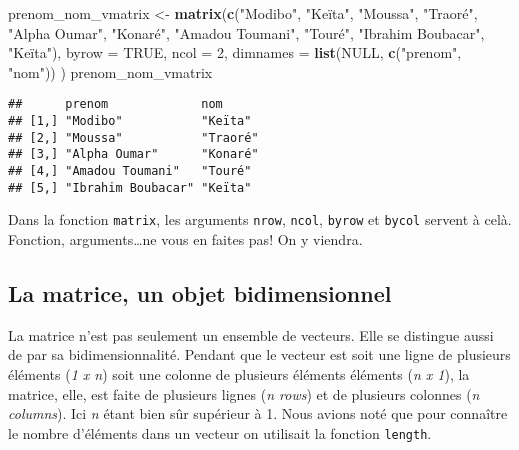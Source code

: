 \documentclass[]{book}
\newenvironment{Shaded}{\begin{snugshade}}{\end{snugshade}}
\newcommand{\KeywordTok}[1]{\textcolor[rgb]{0.13,0.29,0.53}{\textbf{#1}}}
\newcommand{\DataTypeTok}[1]{\textcolor[rgb]{0.13,0.29,0.53}{#1}}
\newcommand{\DecValTok}[1]{\textcolor[rgb]{0.00,0.00,0.81}{#1}}
\newcommand{\StringTok}[1]{\textcolor[rgb]{0.31,0.60,0.02}{#1}}
\newcommand{\OtherTok}[1]{\textcolor[rgb]{0.56,0.35,0.01}{#1}}
\newcommand{\NormalTok}[1]{#1}
\begin{document}
\begin{Shaded}
\begin{Highlighting}[]
\NormalTok{prenom_nom_vmatrix <-}\StringTok{ }\KeywordTok{matrix}\NormalTok{(}\KeywordTok{c}\NormalTok{(}\StringTok{"Modibo"}\NormalTok{, }\StringTok{"Keïta"}\NormalTok{,}
                               \StringTok{"Moussa"}\NormalTok{, }\StringTok{"Traoré"}\NormalTok{,}
                               \StringTok{"Alpha Oumar"}\NormalTok{, }\StringTok{"Konaré"}\NormalTok{, }
                               \StringTok{"Amadou Toumani"}\NormalTok{, }\StringTok{"Touré"}\NormalTok{, }
                               \StringTok{"Ibrahim Boubacar"}\NormalTok{, }\StringTok{"Keïta"}\NormalTok{),}
                             \DataTypeTok{byrow =} \OtherTok{TRUE}\NormalTok{,}
                             \DataTypeTok{ncol =} \DecValTok{2}\NormalTok{,}
                             \DataTypeTok{dimnames =} \KeywordTok{list}\NormalTok{(}\OtherTok{NULL}\NormalTok{, }\KeywordTok{c}\NormalTok{(}\StringTok{"prenom"}\NormalTok{, }\StringTok{"nom"}\NormalTok{))}
\NormalTok{                             )}
\NormalTok{prenom_nom_vmatrix}
\end{Highlighting}
\end{Shaded}

\begin{verbatim}
##      prenom             nom     
## [1,] "Modibo"           "Keïta" 
## [2,] "Moussa"           "Traoré"
## [3,] "Alpha Oumar"      "Konaré"
## [4,] "Amadou Toumani"   "Touré" 
## [5,] "Ibrahim Boubacar" "Keïta"
\end{verbatim}

Dans la fonction \texttt{matrix}, les arguments \texttt{nrow},
\texttt{ncol}, \texttt{byrow} et \texttt{bycol} servent à celà.
Fonction, arguments\ldots{}ne vous en faites pas! On y viendra.

\subsection{La matrice, un objet
bidimensionnel}\label{la-matrice-un-objet-bidimensionnel}

La matrice n'est pas seulement un ensemble de vecteurs. Elle se
distingue aussi de par sa bidimensionnalité. Pendant que le vecteur est
soit une ligne de plusieurs éléments (\emph{1 x n}) soit une colonne de
plusieurs éléments éléments (\emph{n x 1}), la matrice, elle, est faite
de plusieurs lignes (\emph{n rows}) et de plusieurs colonnes (\emph{n
columns}). Ici \emph{n} étant bien sûr supérieur à 1. Nous avions noté
que pour connaître le nombre d'éléments dans un vecteur on utilisait la
fonction \texttt{length}.
\end{document}
